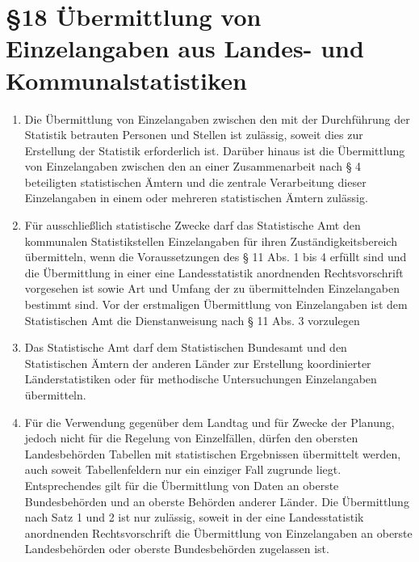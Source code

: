    \section[\S18 Übermittlung von Einzelangaben]{\S18 Übermittlung von Einzelangaben aus Landes- und Kommunalstatistiken}
        \begin{enumerate}
            \item Die Übermittlung von Einzelangaben zwischen den mit der Durchführung der Statistik betrauten Personen und Stellen ist zulässig, soweit dies zur Erstellung der Statistik erforderlich ist. Darüber hinaus ist die Übermittlung von Einzelangaben zwischen den an einer Zusammenarbeit nach § 4 beteiligten statistischen Ämtern und die zentrale Verarbeitung dieser Einzelangaben in einem oder mehreren statistischen Ämtern zulässig.
            \item Für ausschließlich statistische Zwecke darf das Statistische Amt den kommunalen Statistikstellen Einzelangaben für ihren Zuständigkeitsbereich übermitteln, wenn die Voraussetzungen des § 11 Abs. 1 bis 4 erfüllt sind und die Übermittlung in einer eine Landesstatistik anordnenden Rechtsvorschrift vorgesehen ist sowie Art und Umfang der zu übermittelnden Einzelangaben bestimmt sind. Vor der erstmaligen Übermittlung von Einzelangaben ist dem Statistischen Amt die Dienstanweisung nach § 11 Abs. 3 vorzulegen
            \item Das Statistische Amt darf dem Statistischen Bundesamt und den Statistischen Ämtern der anderen Länder zur Erstellung koordinierter Länderstatistiken oder für methodische Untersuchungen Einzelangaben übermitteln.
            \item Für die Verwendung gegenüber dem Landtag und für Zwecke der Planung, jedoch nicht für die Regelung von Einzelfällen, dürfen den obersten Landesbehörden Tabellen mit statistischen Ergebnissen übermittelt werden, auch soweit Tabellenfeldern nur ein einziger Fall zugrunde liegt. Entsprechendes gilt für die Übermittlung von Daten an oberste Bundesbehörden und an oberste Behörden anderer Länder. Die Übermittlung nach Satz 1 und 2 ist nur zulässig, soweit in der eine Landesstatistik anordnenden Rechtsvorschrift die Übermittlung von Einzelangaben an oberste Landesbehörden oder oberste Bundesbehörden zugelassen ist.

\end{enumerate}

